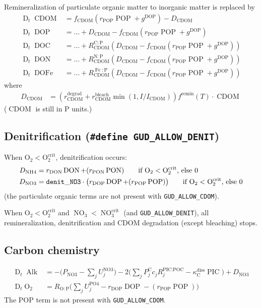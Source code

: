 \documentclass[11pt,letterpaper,english]{article}
\newcommand{\qtext}[1]{\qquad\text{#1}}
\def\|#1|{\operatorname{#1}}
\newcommand{\DDt}{\operatorname{D}_t}
\DeclareMathOperator{\Fe}{Fe}
\DeclareMathOperator{\NO}{NO}
\DeclareMathOperator{\Alk}{Alk}
\DeclareMathOperator{\DOC}{DOC}
\DeclareMathOperator{\DOP}{DOP}
\DeclareMathOperator{\DON}{DON}
\DeclareMathOperator{\DOFe}{DOFe}
\DeclareMathOperator{\POP}{POP}
\DeclareMathOperator{\PON}{PON}
\DeclareMathOperator{\PIC}{PIC}
\DeclareMathOperator{\CDOM}{CDOM}
\DeclareMathOperator{\POiv}{PO4}
\DeclareMathOperator{\NHiv}{NH4}
\DeclareMathOperator{\NOiii}{NO3}
\newcommand{\N}{\mathrm{N}}
\newcommand{\C}{\mathrm{C}}
\renewcommand{\P}{\mathrm{P}}
\renewcommand{\O}{\mathrm{O}}
\newcommand{\PICPOC}{{\text{PIC:POC}}}
\newcommand{\diss}{{\text{diss}}}
\newcommand{\remin}{{\text{remin}}}
\newcommand{\crit}{{\text{crit}}}
\newcommand{\X}{c}
\begin{document}
Remineralization of particulate organic matter to inorganic matter is replaced by
\begin{align*}
  \DDt \CDOM &= f_{\CDOM} (r_{\POP} \POP + g^{\DOP}) - D_{\CDOM}
  \\
  \DDt \DOP  &= \dots + D_{\CDOM} - f_{\CDOM} (r_{\POP} \POP + g^{\DOP}) \\
  \DDt \DOC  &= \dots + R^{\C:\P}_{\CDOM} (D_{\CDOM} - f_{\CDOM} (r_{\POP} \POP + g^{\DOP})) \\
  \DDt \DON  &= \dots + R^{\N:\P}_{\CDOM} (D_{\CDOM} - f_{\CDOM} (r_{\POP} \POP + g^{\DOP})) \\
  \DDt \DOFe &= \dots + R^{\Fe:\P}_{\CDOM}(D_{\CDOM} - f_{\CDOM} (r_{\POP} \POP + g^{\DOP}))
\end{align*}
where
\begin{align*}
  D_{\CDOM} &= \left( r^{\|degrad|}_{\CDOM}
                  + r^{\|bleach|}_{\CDOM} \min(1, I/I_{\CDOM}) \right)
             f^\remin(T) \cdot \CDOM
\end{align*}
($\CDOM$ is still in P units.)



\subsection{Denitrification ({\tt \#define GUD\_ALLOW\_DENIT})}

When $\O_2<\O_2^\crit$, denitrification occurs:
\begin{align*}
  D_{\NHiv}  &= r_{\DON} \DON + (r_{\PON} \PON)
  \qtext{if } \O_2<\O_2^\crit \text{, else } 0 \\
  D_{\NOiii} &= {\tt denit\_NO3} \cdot \bigl(r_{\DOP} \DOP + (r_{\POP} \POP) \bigr)
  \qtext{if } \O_2<\O_2^\crit \text{, else } 0
\end{align*}
(the particulate organic terms are not present with \verb|GUD_ALLOW_CDOM|).

When $\O_2<\O_2^\crit$ and $\NO_3<\NO_3^\crit$ (and \verb|GUD_ALLOW_DENIT|),
all remineralization, denitrification and CDOM degradation (except
bleaching) stops.



\subsection{Carbon chemistry}

\begin{align*}
  \DDt \Alk &= -\biggl( P_{\NOiii} - \sum_j U^{\NOiii}_j \biggr)
    - 2\biggl( \sum_j P^\C_j \X_j R^\PICPOC_j - \kappa^\diss_\C \PIC \biggr)
    + D_{\NOiii}
\\
  \DDt \O_2 &= R_{\O:\P} \biggl( \sum_j U^{\POiv}_j
           - r_{\DOP} \DOP - (r_{\POP} \POP)
         \biggr)
\end{align*}
The POP term is not present with \verb|GUD_ALLOW_CDOM|.
\end{document}
